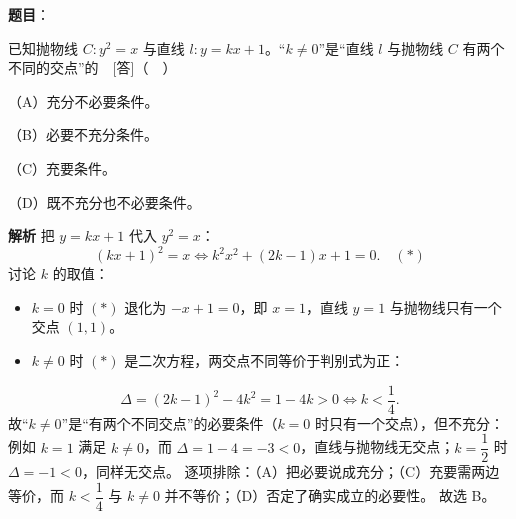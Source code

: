 \begin{answer}

\textbf{题目}：

已知抛物线 $C:y^2=x$ 与直线 $l:y=kx+1$。“$k\neq0$”是“直线 $l$ 与抛物线 $C$ 有两个不同的交点”的　[答]（　）

（A）充分不必要条件。

（B）必要不充分条件。

（C）充要条件。

（D）既不充分也不必要条件。

\textbf{解析}
把 $y=kx+1$ 代入 $y^2=x$：
\nopagebreak[4]
\[\left(kx+1\right)^2=x\iff k^2x^2+\left(2k-1\right)x+1=0.\quad(\ast)\]
讨论 $k$ 的取值：

\begin{itemize}
\item $k=0$ 时 $(\ast)$ 退化为 $-x+1=0$，即 $x=1$，直线 $y=1$ 与抛物线只有一个交点 $(1,1)$。
\item $k\neq0$ 时 $(\ast)$ 是二次方程，两交点不同等价于判别式为正：
\end{itemize}
\nopagebreak[4]
\[\Delta=\left(2k-1\right)^2-4k^2=1-4k>0\iff k<\frac14.\]
故“$k\neq0$”是“有两个不同交点”的必要条件（$k=0$ 时只有一个交点），但不充分：例如 $k=1$ 满足 $k\neq0$，而 $\Delta=1-4=-3<0$，直线与抛物线无交点；$k=\dfrac12$ 时 $\Delta=-1<0$，同样无交点。
逐项排除：（A）把必要说成充分；（C）充要需两边等价，而 $k<\dfrac14$ 与 $k\neq0$ 并不等价；（D）否定了确实成立的必要性。
故选 B。


\end{answer}
